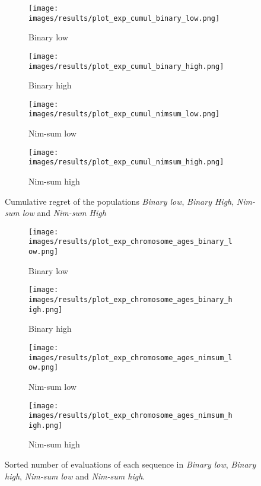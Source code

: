 \begin{figure}[ht]
	\begin{subfigure}{0.49\linewidth}
	\centering
	\texttt{[image: images/results/plot\_exp\_cumul\_binary\_low.png]}
	\caption{Binary low}
	\label{fig:exp_cumul_binary_low}
	\end{subfigure}
	\hfill
	\begin{subfigure}{0.49\linewidth}
	\centering
	\texttt{[image: images/results/plot\_exp\_cumul\_binary\_high.png]}
	\caption{Binary high}
	\label{fig:exp_cumul_binary_high}
	\end{subfigure}
	\begin{subfigure}{0.49\linewidth}
	\centering
	\texttt{[image: images/results/plot\_exp\_cumul\_nimsum\_low.png]}
	\caption{Nim-sum low}
	\label{fig:exp_cumul_nimsum_low}
	\end{subfigure}
	\hfill
	\begin{subfigure}{0.49\linewidth}
	\centering
	\texttt{[image: images/results/plot\_exp\_cumul\_nimsum\_high.png]}
	\caption{Nim-sum high}
	\label{fig:exp_cumul_nimsum_high}
	\end{subfigure}
	\caption{Cumulative regret of the populations \emph{Binary low},
	\emph{Binary High}, \emph{Nim-sum low} and \emph{Nim-sum High}}
	\label{fig:exp_cumul2}
\end{figure}

\begin{figure}[ht]
	\begin{subfigure}{0.49\linewidth}
	\centering
	\texttt{[image: images/results/plot\_exp\_chromosome\_ages\_binary\_low.png]}
	\caption{Binary low}
	\label{fig:exp_age_binary_low}
	\end{subfigure}
	\hfill
	\begin{subfigure}{0.49\linewidth}
	\centering
	\texttt{[image: images/results/plot\_exp\_chromosome\_ages\_binary\_high.png]}
	\caption{Binary high}
	\label{fig:exp_age_binary_high}
	\end{subfigure}
	\begin{subfigure}{0.49\linewidth}
	\centering
	\texttt{[image: images/results/plot\_exp\_chromosome\_ages\_nimsum\_low.png]}
	\caption{Nim-sum low}
	\label{fig:exp_age_nimsum_low}
	\end{subfigure}
	\hfill
	\begin{subfigure}{0.49\linewidth}
	\centering
	\texttt{[image: images/results/plot\_exp\_chromosome\_ages\_nimsum\_high.png]}
	\caption{Nim-sum high}
	\label{fig:exp_age_nimsum_high}
	\end{subfigure}
	\caption{Sorted number of evaluations of each sequence in \emph{Binary
	low}, \emph{Binary high}, \emph{Nim-sum low} and \emph{Nim-sum high}.}
	\label{fig:exp_ages2}
\end{figure}

